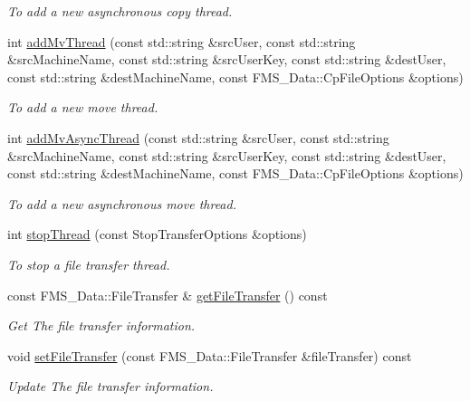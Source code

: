 \begin{DoxyCompactItemize}
\begin{DoxyCompactList}\small\item\em To add a new asynchronous copy thread. \item\end{DoxyCompactList}\item 
int \hyperlink{classFileTransferServer_a1d17c8438d3b18e1064b9389772a0dc2}{addMvThread} (const std::string \&srcUser, const std::string \&srcMachineName, const std::string \&srcUserKey, const std::string \&destUser, const std::string \&destMachineName, const FMS\_\-Data::CpFileOptions \&options)
\begin{DoxyCompactList}\small\item\em To add a new move thread. \item\end{DoxyCompactList}\item 
int \hyperlink{classFileTransferServer_a6693b9cedb08cca79ea0e8ea42531ae0}{addMvAsyncThread} (const std::string \&srcUser, const std::string \&srcMachineName, const std::string \&srcUserKey, const std::string \&destUser, const std::string \&destMachineName, const FMS\_\-Data::CpFileOptions \&options)
\begin{DoxyCompactList}\small\item\em To add a new asynchronous move thread. \item\end{DoxyCompactList}\item 
int \hyperlink{classFileTransferServer_a6fefd4ae4019a033f4752ef6f887e260}{stopThread} (const StopTransferOptions \&options)
\begin{DoxyCompactList}\small\item\em To stop a file transfer thread. \item\end{DoxyCompactList}\item 
const FMS\_\-Data::FileTransfer \& \hyperlink{classFileTransferServer_a74fdd9bba334ebc37fb92f7e58aa7656}{getFileTransfer} () const 
\begin{DoxyCompactList}\small\item\em Get The file transfer information. \item\end{DoxyCompactList}\item 
void \hyperlink{classFileTransferServer_a9b1c4473cbfda5b90ef0e245fea1967a}{setFileTransfer} (const FMS\_\-Data::FileTransfer \&fileTransfer) const 
\begin{DoxyCompactList}\small\item\em Update The file transfer information. \item\end{DoxyCompactList}\end{DoxyCompactItemize}
